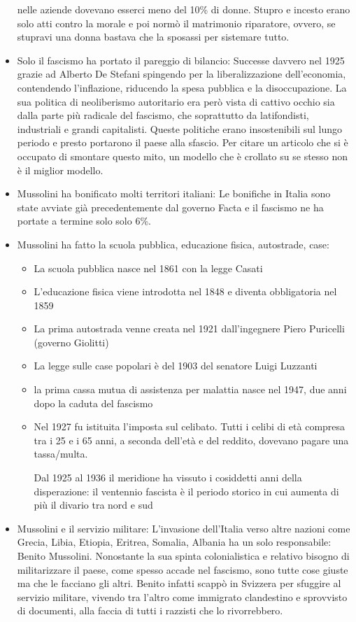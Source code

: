 \documentclass[12pt]{book} %
\begin{document}
\begin{itemize}
nelle aziende dovevano esserci meno del 10\% di donne. Stupro e incesto erano solo atti contro la morale e poi normò il
matrimonio riparatore, ovvero, se stupravi una donna bastava che la sposassi per sistemare tutto.
\item Solo il fascismo ha portato il pareggio di bilancio: Successe davvero nel 1925 grazie ad Alberto De Stefani
spingendo per la liberalizzazione dell'economia, contendendo l'inflazione, riducendo la spesa pubblica e la
disoccupazione. La sua politica di {\textquotedbl}neoliberismo autoritario{\textquotedbl} era però vista di cattivo
occhio sia dalla parte più radicale del fascismo, che soprattutto da latifondisti, industriali e grandi capitalisti.
Queste politiche erano insostenibili sul lungo periodo e presto portarono il paese alla sfascio. Per citare un
articolo che si è occupato di smontare questo
mito, {\textquotedbl}un modello che è crollato su se stesso non è il miglior modello.{\textquotedbl}
\item Mussolini ha bonificato molti territori italiani: Le bonifiche in Italia sono state avviate già precedentemente
dal governo Facta e il fascismo ne ha portate a termine solo solo 6\%.
\item Mussolini ha fatto la scuola pubblica, educazione fisica, autostrade, case:

\begin{itemize}
\item La scuola pubblica nasce nel 1861 con la legge Casati 
\item L'educazione fisica viene introdotta nel 1848 e diventa obbligatoria nel 1859 
\item La prima autostrada venne creata nel 1921 dall'ingegnere Piero Puricelli (governo Giolitti)
\item La legge sulle case popolari è del 1903 del senatore Luigi Luzzanti
\item la prima cassa mutua di assistenza per malattia nasce nel 1947, due anni dopo la caduta del fascismo
\item Nel 1927 fu istituita l'imposta sul celibato. Tutti i celibi di età compresa tra i 25 e i 65 anni, a seconda
dell'età e del reddito, dovevano pagare una tassa/multa.

Dal 1925 al 1936 il meridione ha vissuto i cosiddetti {\textquotedbl}anni della disperazione{\textquotedbl}: il
ventennio fascista è il periodo storico in cui aumenta di più il divario tra nord e sud
\end{itemize}
\item Mussolini e il servizio militare: L'invasione dell'Italia verso altre
nazioni come Grecia, Libia, Etiopia, Eritrea, Somalia, Albania ha un solo responsabile: Benito Mussolini. Nonostante la
sua spinta colonialistica e relativo bisogno di militarizzare il paese, come spesso accade nel fascismo, sono tutte
cose giuste ma che le facciano gli altri. Benito infatti scappò in Svizzera per sfuggire al servizio militare, vivendo
tra l'altro come immigrato clandestino e sprovvisto di documenti, alla faccia di tutti i razzisti
che lo rivorrebbero.


\end{itemize}
\end{document}
